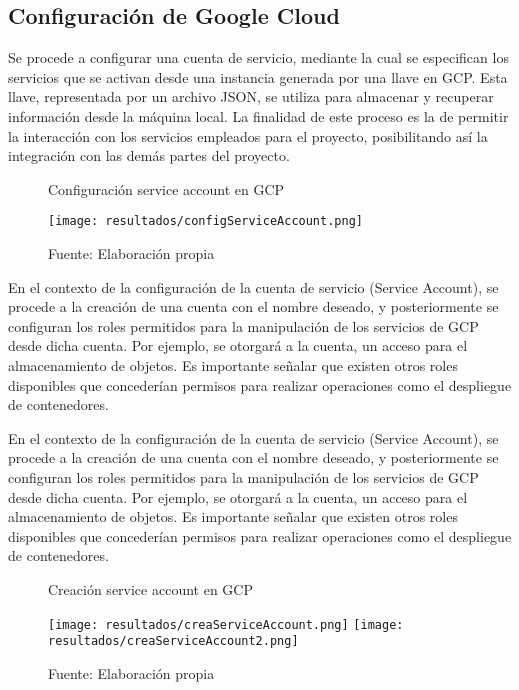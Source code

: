 \subsection{Configuración de Google Cloud}

Se procede a configurar una cuenta de servicio, mediante la cual se especifican los servicios que se activan desde una instancia generada por una llave en GCP. Esta llave, representada por un archivo JSON, se utiliza para almacenar y recuperar información desde la máquina local. La finalidad de este proceso es la de permitir la interacción con los servicios empleados para el proyecto, posibilitando así la integración con las demás partes del proyecto.

\begin{figure}[h]
	\centering
	\caption{Configuración service account en GCP}
	\texttt{[image: resultados/configServiceAccount.png]}
	\caption*{\footnotesize Fuente: Elaboración propia}
	\label{fig:figuraConfigServiceAccount}
\end{figure}

\newpage

En el contexto de la configuración de la cuenta de servicio (Service Account), se procede a la creación de una cuenta con el nombre deseado, y posteriormente se configuran los roles permitidos para la manipulación de los servicios de GCP desde dicha cuenta. Por ejemplo, se otorgará a la cuenta, un acceso para el almacenamiento de objetos. Es importante señalar que existen otros roles disponibles que concederían permisos para realizar operaciones como el despliegue de contenedores. \newline

En el contexto de la configuración de la cuenta de servicio (Service Account), se procede a la creación de una cuenta con el nombre deseado, y posteriormente se configuran los roles permitidos para la manipulación de los servicios de GCP desde dicha cuenta. Por ejemplo, se otorgará a la cuenta, un acceso para el almacenamiento de objetos. Es importante señalar que existen otros roles disponibles que concederían permisos para realizar operaciones como el despliegue de contenedores.

\newpage

\begin{figure}[h]
	\centering
	\caption{Creación service account en GCP}
	\texttt{[image: resultados/creaServiceAccount.png]}
	\texttt{[image: resultados/creaServiceAccount2.png]}
	\caption*{\footnotesize Fuente: Elaboración propia}
	\label{fig:figuraCreaServiceAccount}
\end{figure}

